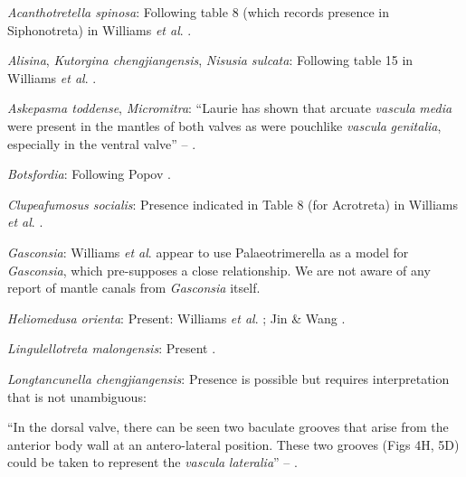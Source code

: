 \documentclass[openany]{book}
\begin{document}
\hypertarget{Acanthotretella_spinosa-coding-37}{}
\emph{Acanthotretella spinosa}: Following table 8 (which records
presence in Siphonotreta) in Williams \emph{et al}.
\citeyearpar{Williams2000LinguliformeaCraniiformea}.

\hypertarget{Alisina-coding-37}{}
\emph{Alisina}, \emph{Kutorgina chengjiangensis}, \emph{Nisusia
sulcata}: Following table 15 in Williams \emph{et al}.
\citeyearpar{Williams2000LinguliformeaCraniiformea}.

\hypertarget{Askepasma_toddense-coding-37}{}
\emph{Askepasma toddense}, \emph{Micromitra}: ``Laurie
\citeyearpar{Laurie1987Themusculature} has shown that arcuate
\emph{vascula} \emph{media} were present in the mantles of both valves
as were pouchlike \emph{vascula} \emph{genitalia}, especially in the
ventral valve'' -- \citet{Williams1997Introduction}.

\hypertarget{Botsfordia-coding-37}{}
\emph{Botsfordia}: Following Popov \citeyearpar{Popov1992TheCambrian}.

\hypertarget{Clupeafumosus_socialis-coding-37}{}
\emph{Clupeafumosus socialis}: Presence indicated in Table 8 (for
Acrotreta) in Williams \emph{et al}.
\citeyearpar{Williams2000LinguliformeaCraniiformea}.

\hypertarget{Gasconsia-coding-37}{}
\emph{Gasconsia}: Williams \emph{et al}. \citeyearpar[table
15]{Williams2000LinguliformeaCraniiformea} appear to use
Palaeotrimerella \citep[as drawn in][]{Williams1997Introduction} as a
model for \emph{Gasconsia}, which pre-supposes a close relationship. We
are not aware of any report of mantle canals from \emph{Gasconsia}
itself.

\hypertarget{Heliomedusa_orienta-coding-37}{}
\emph{Heliomedusa orienta}: Present: Williams \emph{et al}.
\citeyearpar{Williams2000LinguliformeaCraniiformea}; Jin \& Wang
\citeyearpar{Jin1992Revisionof}.

\hypertarget{Lingulellotreta_malongensis-coding-37}{}
\emph{Lingulellotreta malongensis}: Present
\citep{Williams2000LinguliformeaCraniiformea}.

\hypertarget{Longtancunella_chengjiangensis-coding-37}{}
\emph{Longtancunella chengjiangensis}: Presence is possible but requires
interpretation that is not unambiguous:

``In the dorsal valve, there can be seen two baculate grooves that arise
from the\\
anterior body wall at an antero-lateral position. These two grooves
(Figs 4H, 5D) could be taken to represent the \emph{vascula}
\emph{lateralia}'' -- \citet{Zhang2007Agregarious}.
\end{document}
